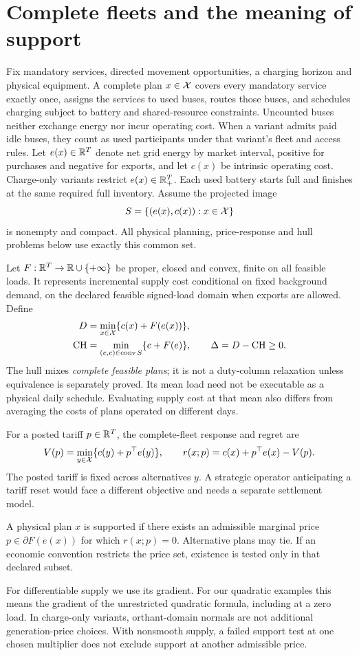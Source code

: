 \section{Complete fleets and the meaning of support}\label{sec:framework}
Fix mandatory services, directed movement opportunities, a charging horizon
and physical equipment. A complete plan $x\in\mathcal X$ covers every mandatory
service exactly once, assigns the services to used buses, routes those buses,
and schedules charging subject to battery and shared-resource constraints.
Uncounted buses neither exchange energy nor incur operating cost. When a
variant admits paid idle buses, they count as used participants under that
variant's fleet and access rules. Let $e(x)\in\mathbb R^T$ denote net grid energy
by market interval, positive for purchases and negative for exports, and let
$c(x)$ be intrinsic operating cost. Charge-only variants restrict
$e(x)\in\mathbb R_+^T$. Each used battery starts full and finishes at the
same required full inventory. Assume the projected image
\[
 S=\{(e(x),c(x)):x\in\mathcal X\}
\]
is nonempty and compact. All physical planning, price-response and hull
problems below use exactly this common set.

Let $F:\mathbb R^T\to\mathbb R\cup\{+\infty\}$ be proper, closed and convex, finite on
all feasible loads. It represents incremental supply cost conditional on
fixed background demand, on the declared feasible signed-load domain when
exports are allowed. Define
\begin{align}
 D&=\min_{x\in\mathcal X}\{c(x)+F(e(x))\},\label{eq:D}\\
 \mathrm{CH}&=\min_{(e,c)\in\operatorname{conv}S}\{c+F(e)\},
 \qquad\Delta=D-\mathrm{CH}\ge0.\label{eq:CH}
\end{align}
The hull mixes \emph{complete feasible plans}; it is not a duty-column
relaxation unless equivalence is separately proved. Its mean load need not
be executable as a physical daily schedule. Evaluating supply cost at that
mean also differs from averaging the costs of plans operated on different
days.

For a posted tariff $p\in\mathbb R^T$, the complete-fleet response and regret are
\begin{equation}\label{eq:regret}
 V(p)=\min_{y\in\mathcal X}\{c(y)+p^\top e(y)\},\qquad
 r(x;p)=c(x)+p^\top e(x)-V(p).
\end{equation}
The posted tariff is fixed across alternatives $y$. A strategic operator
anticipating a tariff reset would face a different objective and needs a
separate settlement model.

\begin{definition}
A physical plan $x$ is supported if there exists an admissible marginal
price $p\in\partial F(e(x))$ for which $r(x;p)=0$. Alternative plans may
tie. If an economic convention restricts the price set, existence is tested
only in that declared subset.
\end{definition}
For differentiable supply we use its gradient. For our quadratic examples
this means the gradient of the unrestricted quadratic formula, including
at a zero load. In charge-only variants, orthant-domain normals are not additional
generation-price choices. With nonsmooth supply, a failed support test at
one chosen multiplier does not exclude support at another admissible price.

